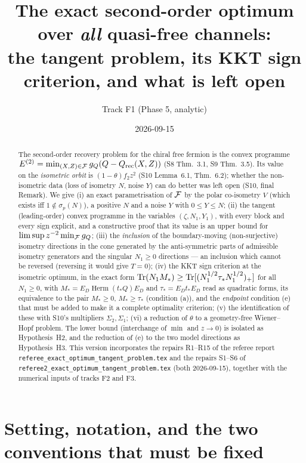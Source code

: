 \documentclass[11pt]{article}
\title{The exact second-order optimum over \emph{all} quasi-free channels:\\
the tangent problem, its KKT sign criterion, and what is left open}
\author{Track F1 (Phase 5, analytic)}
\date{2026-09-15}
\newcommand{\Herm}{\operatorname{Herm}}
\begin{document}
\maketitle

\begin{abstract}
The second-order recovery problem for the chiral free fermion is the convex programme
$E^{(2)}=\min_{(X,Z)\in\mathcal F}g_Q(Q-Q_{\rm rec}(X,Z))$ (S8 Thm.~3.1, S9 Thm.~3.5).  Its value
on the \emph{isometric orbit} is $(1-\theta)f_2z^2$ (S10 Lemma~6.1, Thm.~6.2); whether the
non-isometric data (loss of isometry $N$, noise $Y$) can do better was left open (S10,
final Remark).  We give (i) an exact parametrisation of $\mathcal F$ by the polar co-isometry $V$
(which exists iff $1\notin\sigma_p(N)$), a positive $N$ and a noise $Y$ with $0\le Y\le N$;
(ii) the tangent (leading-order) convex programme in the variables $(\zeta,N_1,Y_1)$, with
every block and every sign explicit, and a constructive proof that its value is an upper
bound for $\limsup z^{-2}\min_\mathcal F g_Q$; (iii) the \emph{inclusion} of the boundary-moving
(non-surjective) isometry directions in the cone generated by the anti-symmetric parts of admissible isometry
generators and the singular $N_1\ge0$ directions --- an inclusion which cannot be reversed
(reversing it would give $T=0$); (iv) the KKT sign criterion at the isometric optimum, in
the exact form $\operatorname{Tr}(N_1M_*)\ge\operatorname{Tr}[(N_1^{1/2}\tau_*N_1^{1/2})_+]$ for all $N_1\ge0$, with
$M_*=E_D\Herm(t_*Q)E_D$ and $\tau_*=E_Dt_*E_D$ read as quadratic forms, its equivalence to
the pair $M_*\ge0$, $M_*\ge\tau_*$ (condition (a)), and the \emph{endpoint} condition (e)
that must be added to make it a complete optimality criterion; (v) the identification of
these with S10's multipliers $\Sigma_2,\Sigma_1$; (vi) a reduction of $\theta$ to a
geometry-free Wiener--Hopf problem.  The lower bound (interchange of $\min$ and $z\to0$) is
isolated as Hypothesis~H2, and the reduction of (e) to the two model directions as
Hypothesis~H3.  This version incorporates the repairs R1--R15 of the referee
report \texttt{referee\_exact\_optimum\_tangent\_problem.tex} and the repairs S1--S6 of
\texttt{referee2\_exact\_optimum\_tangent\_problem.tex} (both 2026-09-15), together with
the numerical inputs of tracks F2 and F3.
\end{abstract}

\tableofcontents

\section{Setting, notation, and the two conventions that must be fixed}\label{sec:setup}
\end{document}
